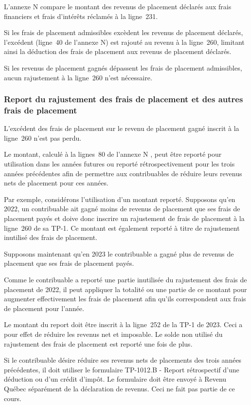 L'annexe N compare le montant des revenus de placement déclarés aux frais financiers et frais d'intérêts réclamés à la ligne~231.

Si les frais de placement admissibles excèdent les revenus de placement déclarés, l'excédent (ligne~40 de l'annexe N) est rajouté au revenu à la ligne~260, limitant ainsi la déduction des frais de placement aux revenus de placement déclarés.

Si les revenus de placement gagnés dépassent les frais de placement admissibles, aucun rajustement à la ligne~260 n'est nécessaire.

\subsubsection{Report du rajustement des frais de placement et des autres frais de placement}
L'excédent des frais de placement sur le revenu de placement gagné inscrit à la ligne~260 n'est pas perdu. 

Le montant, calculé à la lignes~80 de l'annexe N , peut être reporté pour utilisation dans les années futures ou reporté rétrospectivement pour les trois années précédentes afin de permettre aux contribuables de réduire leurs revenus nets de placement pour ces années. 

Par exemple, considérons l'utilisation d'un montant reporté. Supposons qu'en 2022, un contribuable ait gagné moins de revenus de placement que ses frais de placement payés et doive donc inscrire un rajustement de frais de placement à la ligne~260 de sa TP-1. Ce montant est également reporté à titre de rajustement inutilisé des frais de placement. 

Supposons maintenant qu'en 2023 le contribuable a gagné plus de revenus de placement que ses frais de placement payés. 

Comme le contribuable a reporté une partie inutilisée du rajustement des frais de placement de 2022, il peut appliquer la totalité ou une partie de ce montant pour augmenter effectivement les frais de placement afin qu'ils correspondent aux frais de placement pour l'année.

Le montant du report doit être inscrit à la ligne~252 de la TP-1 de 2023. Ceci a pour effet de réduire les revenus net et imposable. Le solde non utilisé du rajustement des frais de placement est reporté une fois de plus.

Si le contribuable désire réduire ses revenus nets de placements des trois années précédentes, il doit utiliser le formulaire TP-1012.B - Report rétrospectif d'une déduction ou d'un crédit d'impôt. Le formulaire doit être envoyé à Revenu Québec séparément de la déclaration de revenus. Ceci ne fait pas partie de ce cours.



